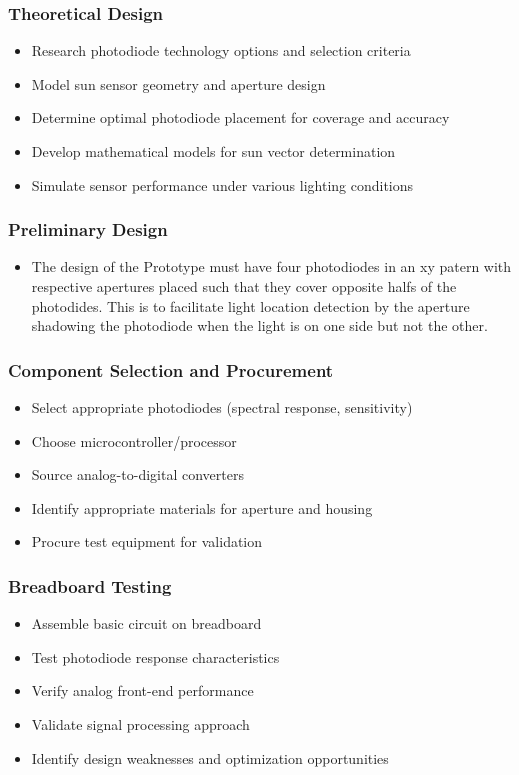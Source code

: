 \subsubsection*{Theoretical Design}
\begin{itemize}
  \item Research photodiode technology options and selection criteria
  \item Model sun sensor geometry and aperture design
  \item Determine optimal photodiode placement for coverage and accuracy
  \item Develop mathematical models for sun vector determination
  \item Simulate sensor performance under various lighting conditions
\end{itemize}

\subsubsection*{Preliminary Design}
\begin{itemize}
  \item The design of the Prototype must have four photodiodes in an xy patern with respective apertures placed such that they cover opposite halfs of the photodides. This is to facilitate light location detection by the aperture shadowing the photodiode when the light is on one side but not the other.
\end{itemize}

\subsubsection*{Component Selection and Procurement}
\begin{itemize}
  \item Select appropriate photodiodes (spectral response, sensitivity)
  \item Choose microcontroller/processor
  \item Source analog-to-digital converters
  \item Identify appropriate materials for aperture and housing
  \item Procure test equipment for validation
\end{itemize}

\subsubsection*{Breadboard Testing}
\begin{itemize}
  \item Assemble basic circuit on breadboard
  \item Test photodiode response characteristics
  \item Verify analog front-end performance
  \item Validate signal processing approach
  \item Identify design weaknesses and optimization opportunities
\end{itemize}

